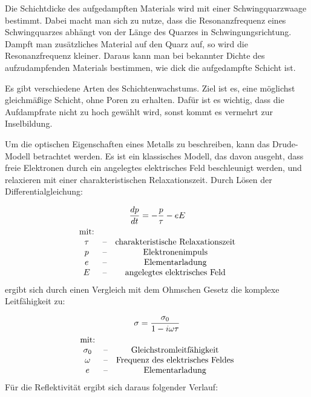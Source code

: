 \documentclass[10pt,twoside]{article}
\renewcommand{\1}{^{-1}}
\renewcommand{\2}{^{-2}}
\newcommand{\3}{^{-3}}
\newcommand{\4}{^{-4}}
\newcommand{\5}{^{-5}}
\newcommand{\6}{^{-6}}
\newcommand{\7}{^{-7}}
\newcommand{\8}{^{-8}}
\newcommand{\9}{^{-9}}
\begin{document}
Die Schichtdicke des aufgedampften Materials wird mit einer Schwingquarzwaage bestimmt.
Dabei macht man sich zu nutze, dass die Resonanzfrequenz eines Schwingquarzes abhängt von der Länge des Quarzes in Schwingungsrichtung. Dampft man zusätzliches Material auf den Quarz auf, so wird die Resonanzfrequenz kleiner. Daraus kann man bei bekannter Dichte des aufzudampfenden Materials bestimmen, wie dick die aufgedampfte Schicht ist.

Es gibt verschiedene Arten des Schichtenwachstums. Ziel ist es, eine möglichst gleichmäßige Schicht, ohne Poren zu erhalten. Dafür ist es wichtig, dass die Aufdampfrate nicht zu hoch gewählt wird, sonst kommt es vermehrt zur Inselbildung. %

Um die optischen Eigenschaften eines Metalls zu beschreiben, kann das Drude-Modell betrachtet werden.
Es ist ein klassisches Modell, das davon ausgeht, dass freie Elektronen durch ein angelegtes elektrisches Feld beschleunigt werden, und relaxieren mit einer charakteristischen Relaxationszeit.
Durch Lösen der Differentialgleichung:

\begin{gather}
\frac{dp}{dt}=-\frac{p}{\tau}-eE \\
\begin{matrix}
   \text{mit:} &&\\
   \tau & \text{--} & \text{charakteristische Relaxationszeit} \\
   p & \text{--} & \text{Elektronenimpuls} \\
   e & \text{--} & \text{Elementarladung} \\
   E & \text{--} & \text{angelegtes elektrisches Feld} \\
\end{matrix}\notag
\end{gather}
ergibt sich durch einen Vergleich mit dem Ohmschen Gesetz die komplexe Leitfähigkeit zu:

\begin{gather}
\sigma =\frac{\sigma_0 }{1-i \omega \tau} \\
\begin{matrix}
   \text{mit:} &&\\
   \sigma_0 & \text{--} & \text{Gleichstromleitfähigkeit} \\
   \omega & \text{--} & \text{Frequenz des elektrisches Feldes} \\
   e & \text{--} & \text{Elementarladung} \\
\end{matrix}\notag
\end{gather}
Für die Reflektivität ergibt sich daraus folgender Verlauf:
\end{document}
